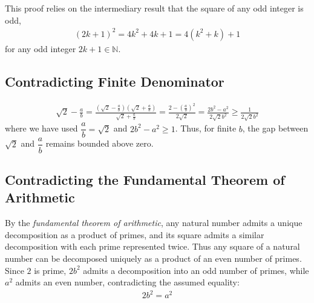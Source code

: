 This proof relies on the intermediary result that the square of any odd integer is odd, 
\begin{align*}
(2k+1)^2 = 4k^2 + 4k + 1 = 4(k^2 + k) + 1
\end{align*} 
for any odd integer $2k+1 \in \mathbb{N}$.

\subsection*{Contradicting Finite Denominator}

\begin{align*}
\sqrt{2} - \frac{a}{b} 
= \frac{\left(\sqrt{2} - \frac{a}{b}\right)\left(\sqrt{2} + \frac{a}{b}\right)}{\sqrt{2} + \frac{a}{b}} 
= \frac{2- \left(\frac{a}{b}\right)^2}{2\sqrt{2}} 
= \frac{2b^2- a^2}{2\sqrt{2}b^2} \geq \frac{1}{2\sqrt{2}b^2}
\end{align*}
where we have used $\dfrac{a}{b}=\sqrt{2}$ and $2b^2- a^2 \geq 1$. Thus, for finite $b$, the gap between $\sqrt{2}$ and $\dfrac{a}{b}$ remains bounded above zero. 

\subsection*{Contradicting the Fundamental Theorem of Arithmetic}
By the \textit{fundamental theorem of arithmetic}, any natural number admits a unique decomposition as a product of primes, and its square admits a similar decomposition with each prime represented twice. Thus any square of a natural number can be decomposed uniquely as a product of an even number of primes. Since $2$ is prime, $2b^2$ admits a decomposition into an odd number of primes, while $a^2$ admits an even number, contradicting the assumed equality:
\begin{align*}
2b^2 = a^2
\end{align*}
